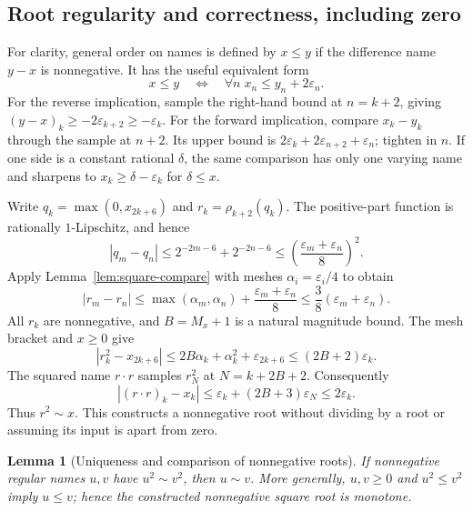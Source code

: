\documentclass[11pt,a4paper]{article}
\newtheorem{lemma}[theorem]{Lemma}
\theoremstyle{definition}
\newcommand{\eps}{\varepsilon}
\newcommand{\abs}[1]{\left|#1\right|}
\newcommand{\rhoq}[2]{\rho_{#1}\!\left(#2\right)}
\numberwithin{equation}{section}
\begin{document}
\subsection{Root regularity and correctness, including zero}

For clarity, general order on names is defined by
\(x\le y\) if the difference name \(y-x\) is nonnegative.
It has the useful equivalent form
\[
 x\le y\quad\Longleftrightarrow\quad
 \forall n\;x_n\le y_n+2\eps_n.
 \tag{3.7a}\label{eq:order-test}
\]
For the reverse implication, sample the right-hand bound at
\(n=k+2\), giving \((y-x)_k\ge-2\eps_{k+2}\ge-\eps_k\).
For the forward implication, compare \(x_k-y_k\) through the
sample at \(n+2\). Its upper bound is
\(2\eps_k+2\eps_{n+2}+\eps_n\); tighten in \(n\).
If one side is a constant rational \(\delta\), the same comparison
has only one varying name and sharpens to
\(x_k\ge\delta-\eps_k\) for \(\delta\le x\).

Write \(q_k=\max(0,x_{2k+6})\) and \(r_k=\rhoq{k+2}{q_k}\).
The positive-part function is rationally \(1\)-Lipschitz, and hence
\[
 \abs{q_m-q_n}\le2^{-2m-6}+2^{-2n-6}
 \le\left(\frac{\eps_m+\eps_n}{8}\right)^2.
\]
Apply Lemma~\ref{lem:square-compare} with meshes
\(\alpha_i=\eps_i/4\) to obtain
\[
 \abs{r_m-r_n}\le
 \max(\alpha_m,\alpha_n)+\frac{\eps_m+\eps_n}{8}
 \le\frac38(\eps_m+\eps_n).
 \tag{3.8}
\]
All \(r_k\) are nonnegative, and \(B=M_x+1\) is a natural magnitude
bound. The mesh bracket and \(x\ge0\) give
\[
 \abs{r_k^2-x_{2k+6}}
 \le2B\alpha_k+\alpha_k^2+\eps_{2k+6}
 \le(2B+2)\eps_k.
 \tag{3.9}\label{eq:root-square-error}
\]
The squared name \(r\cdot r\) samples \(r_N^2\) at \(N=k+2B+2\).
Consequently
\[
 \abs{(r\cdot r)_k-x_k}
 \le\eps_k+(2B+3)\eps_N\le2\eps_k.
\]
Thus \(r^2\sim x\). This constructs a nonnegative root without
dividing by a root or assuming its input is apart from zero.

\begin{lemma}[Uniqueness and comparison of nonnegative roots]
\label{lem:unique-root}
If nonnegative regular names \(u,v\) have \(u^2\sim v^2\), then
\(u\sim v\). More generally, \(u,v\ge0\) and \(u^2\le v^2\)
imply \(u\le v\); hence the constructed nonnegative square root
is monotone.
\end{lemma}
\end{document}
